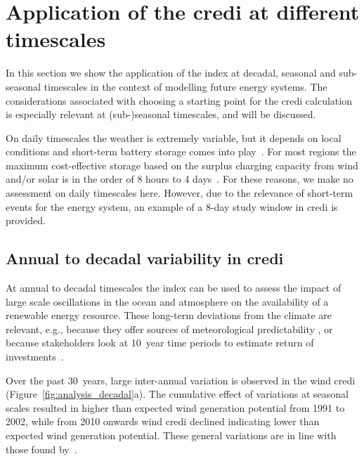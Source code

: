 \documentclass[12pt]{iopart}
\newcommand{\credi}[0]{{\sc credi}}
\newcommand{\wdi}[0]{{\sc wind credi}}
\begin{document}

\section{Application of the \credi{} at different timescales}\label{secCP2:analysis}
In this section we show the application of the index at decadal, seasonal and sub-seasonal timescales in the context of modelling future energy systems. 
The considerations associated with choosing a starting point for the \credi{} calculation is especially relevant at (sub-)seasonal timescales, and will be discussed.

On daily timescales the weather is extremely variable, but it depends on local conditions and short-term battery storage comes into play~\autocite{parzen2023value}. 
For most regions the maximum cost-effective storage based on the surplus charging capacity from wind and/or solar is in the order of 8 hours to 4 days~\parencite{Livingston2020,Sepulveda2021,parzen2023value}. 
For these reasons, we make no assessment on daily timescales here. 
However, due to the relevance of short-term events for the energy system, an example of a 8-day study window in \credi{} is provided.






\subsection{Annual to decadal variability in \credi}\label{sc:decadal}
At annual to decadal timescales the index can be used to assess the impact of large scale oscillations in the ocean and atmosphere on the availability of a renewable energy resource. 
These long-term deviations from the climate are relevant, e.g., because they offer sources of meteorological predictability \parencite{Hawkins2009,Scaife2014}, or because stakeholders look at 10~year time periods to estimate return of investments~\parencite{tennet2023}.

Over the past 30~years, large inter-annual variation is observed in the \wdi{} (Figure~\ref{fig:analysis_decadal}a). 
The cumulative effect of variations at seasonal scales resulted in higher than expected wind generation potential from 1991 to 2002, while from 2010 onwards \wdi{} declined indicating lower than expected wind generation potential. 
These general variations are in line with those found by~\textcite{wohland2019significant,stoop2021detection}. 
\end{document}

